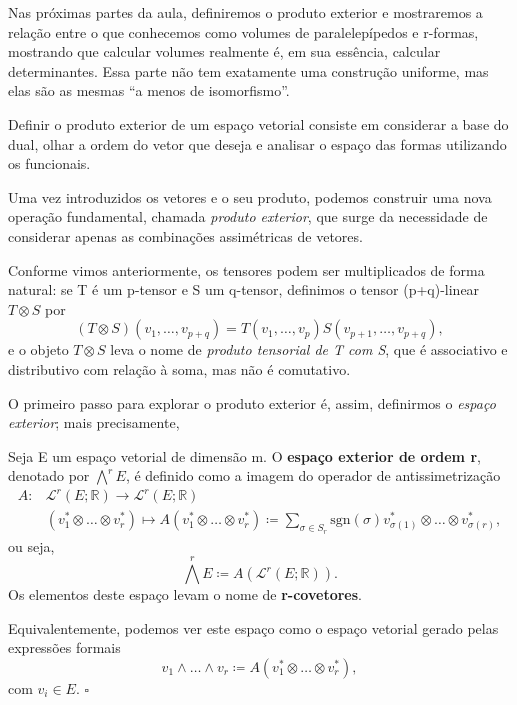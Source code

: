 \documentclass[../differential_forms.tex]{subfiles}
\begin{document}
Nas próximas partes da aula, definiremos o produto exterior e mostraremos a relação entre o que conhecemos como volumes de paralelepípedos e
r-formas, mostrando que calcular volumes realmente é, em sua essência, calcular determinantes. Essa parte não tem exatamente uma construção uniforme,
mas elas são as mesmas ``a menos de isomorfismo''.

Definir o produto exterior de um espaço vetorial consiste em considerar a base do dual, olhar a ordem do vetor que deseja e analisar o espaço das formas
utilizando os funcionais.

Uma vez introduzidos os vetores e o seu produto, podemos construir uma nova operação fundamental, chamada \textit{produto exterior}, que surge da necessidade de considerar
apenas as combinações assimétricas de vetores.

Conforme vimos anteriormente, os tensores podem ser multiplicados de forma natural: se T é um p-tensor e S um q-tensor, definimos o tensor (p+q)-linear \(T\otimes S\) por
\[
	(T\otimes S)(v_1, \dotsc , v_{p+q}) = T(v_1, \dotsc , v_p)S(v_{p+1}, \dotsc , v_{p+q}),
\]
e o objeto \(T\otimes S\) leva o nome de \textit{produto tensorial de T com S}, que é associativo e distributivo com relação à soma, mas não é comutativo.

O primeiro passo para explorar o produto exterior é, assim, definirmos o \textit{espaço exterior}; mais precisamente,
\begin{def*}
	Seja E um espaço vetorial de dimensão m. O \textbf{espaço exterior de ordem r}, denotado por \(\bigwedge^{r}E\), é definido como a imagem do
	operador de antissimetrização
	\begin{align*}
		A: & \mathcal{L}^{r}(E; \mathbb{R})\rightarrow\mathcal{L}^{r}(E; \mathbb{R})                                                                                                                                                        \\
		   & (v_{1}^{*}\otimes \dotsc \otimes v_{r}^{*})\longmapsto A(v_{1}^{*}\otimes \dotsc \otimes v_{r}^{*}) \coloneqq \sum\limits_{\sigma \in S_r}^{}\mathrm{sgn}(\sigma )v_{\sigma (1)}^{*}\otimes \dotsc \otimes v_{\sigma (r)}^{*},
	\end{align*}
	ou seja,
	\[
		\bigwedge^{r}E\coloneqq A(\mathcal{L}^{r}(E; \mathbb{R})).
	\]
	Os elementos deste espaço levam o nome de \textbf{r-covetores}.

	Equivalentemente, podemos ver este espaço como o espaço vetorial gerado pelas expressões formais
	\[
		v_1 \wedge \dotsc \wedge v_r \coloneqq A(v_{1}^{*}\otimes \dotsc \otimes v_{r}^{*}),
	\]
	com \(v_{i}\in E\). \(\square\)
\end{def*}
\end{document}

